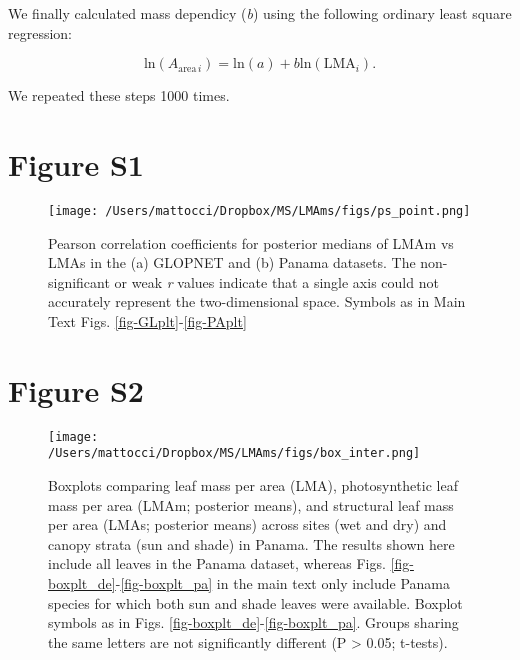 \documentclass[
  12pt,
  letterpaper,
  DIV=11,
  numbers=noendperiod]{scrartcl}
\begin{document}
We finally calculated mass dependicy (\emph{b}) using the following
ordinary least square regression:

\[
\mathrm{ln}(A_{\mathrm{area} \, i}) = \mathrm{ln}(a) + b \mathrm{ln}(\mathrm{LMA}_{i}).
\]

We repeated these steps 1000 times.

\newpage

\hypertarget{figure-s1}{%
\section{Figure S1}\label{figure-s1}}

\begin{figure}

{\centering \texttt{[image: /Users/mattocci/Dropbox/MS/LMAms/figs/ps\_point.png]}

}

\caption{\label{fig-LMAm_LMAs}Pearson correlation coefficients for
posterior medians of LMAm vs LMAs in the (a) GLOPNET and (b) Panama
datasets. The non-significant or weak \emph{r} values indicate that a
single axis could not accurately represent the two-dimensional space.
Symbols as in Main Text Figs. \ref{fig-GLplt}-\ref{fig-PAplt}}

\end{figure}

\newpage

\hypertarget{figure-s2}{%
\section{Figure S2}\label{figure-s2}}

\begin{figure}

{\centering \texttt{[image: /Users/mattocci/Dropbox/MS/LMAms/figs/box\_inter.png]}

}

\caption{\label{fig-box_inter}Boxplots comparing leaf mass per area
(LMA), photosynthetic leaf mass per area (LMAm; posterior means), and
structural leaf mass per area (LMAs; posterior means) across sites (wet
and dry) and canopy strata (sun and shade) in Panama. The results shown
here include all leaves in the Panama dataset, whereas Figs.
\ref{fig-boxplt_de}-\ref{fig-boxplt_pa} in the main text only include
Panama species for which both sun and shade leaves were available.
Boxplot symbols as in Figs. \ref{fig-boxplt_de}-\ref{fig-boxplt_pa}.
Groups sharing the same letters are not significantly different (P
\textgreater{} 0.05; t-tests).}

\end{figure}
\end{document}
